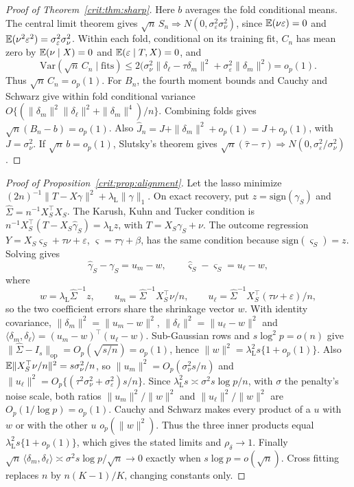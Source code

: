 \begin{proof}[Proof of Theorem~\ref{crit:thm:sharp}]
Here $b$ averages the fold conditional means. The central limit theorem gives $\sqrt n\,S_n\Rightarrow N(0,\sigma_\varepsilon^2\sigma_\nu^2)$, since $\mathbb{E}(\nu\varepsilon)=0$ and $\mathbb{E}(\nu^2\varepsilon^2)=\sigma_\varepsilon^2\sigma_\nu^2$. Within each fold, conditional on its training fit, $C_n$ has mean zero by $\mathbb{E}(\nu\mid X)=0$ and $\mathbb{E}(\varepsilon\mid T,X)=0$, and
\[
\mathrm{Var}(\sqrt n\,C_n\mid\text{fits})\le2\bigl(\sigma_\nu^2\|\delta_\ell-\tau\delta_m\|^2+\sigma_\varepsilon^2\|\delta_m\|^2\bigr)=o_p(1).
\]
Thus $\sqrt n\,C_n=o_p(1)$. For $B_n$, the fourth moment bounds and Cauchy and Schwarz give within fold conditional variance $O\{(\|\delta_m\|^2\|\delta_\ell\|^2+\|\delta_m\|^4)/n\}$. Combining folds gives $\sqrt n(B_n-b)=o_p(1)$. Also $\hat J_n=J+\|\delta_m\|^2+o_p(1)=J+o_p(1)$, with $J=\sigma_\nu^2$. If $\sqrt n\,b=o_p(1)$, Slutsky's theorem gives $\sqrt n(\hat\tau-\tau)\Rightarrow N(0,\sigma_\varepsilon^2/\sigma_\nu^2)$.
\end{proof}

\begin{proof}[Proof of Proposition~\ref{crit:prop:alignment}]
Let the lasso minimize $(2n)^{-1}\|T-X\gamma\|^2+\lambda_{\mathrm L}\|\gamma\|_1$. On exact recovery, put $z=\mathrm{sign}(\gamma_S)$ and $\hat\Sigma=n^{-1}X_S^\top X_S$. The Karush, Kuhn and Tucker condition is $n^{-1}X_S^\top(T-X_S\hat\gamma_S)=\lambda_{\mathrm L}z$, with $T=X_S\gamma_S+\nu$. The outcome regression $Y=X_S\varsigma_S+\tau\nu+\varepsilon$, $\varsigma=\tau\gamma+\beta$, has the same condition because $\mathrm{sign}(\varsigma_S)=z$. Solving gives
\[
\hat\gamma_S-\gamma_S=u_m-w,\qquad \hat\varsigma_S-\varsigma_S=u_\ell-w,
\]
where
\[
w=\lambda_{\mathrm L}\hat\Sigma^{-1}z,\qquad u_m=\hat\Sigma^{-1}X_S^\top\nu/n,\qquad u_\ell=\hat\Sigma^{-1}X_S^\top(\tau\nu+\varepsilon)/n,
\]
so the two coefficient errors share the shrinkage vector $w$. With identity covariance, $\|\delta_m\|^2=\|u_m-w\|^2$, $\|\delta_\ell\|^2=\|u_\ell-w\|^2$ and $\langle\delta_m,\delta_\ell\rangle=(u_m-w)^\top(u_\ell-w)$. Sub-Gaussian rows and $s\log^2p=o(n)$ give $\|\hat\Sigma-I_s\|_{\mathrm{op}}=O_p(\sqrt{s/n})=o_p(1)$, hence $\|w\|^2=\lambda_{\mathrm L}^2s\{1+o_p(1)\}$. Also $\mathbb{E}\|X_S^\top\nu/n\|^2=s\sigma_\nu^2/n$, so $\|u_m\|^2=O_p(\sigma_\nu^2s/n)$ and $\|u_\ell\|^2=O_p\{(\tau^2\sigma_\nu^2+\sigma_\varepsilon^2)s/n\}$. Since $\lambda_{\mathrm L}^2s\asymp\sigma^2s\log p/n$, with $\sigma$ the penalty's noise scale, both ratios $\|u_m\|^2/\|w\|^2$ and $\|u_\ell\|^2/\|w\|^2$ are $O_p(1/\log p)=o_p(1)$. Cauchy and Schwarz makes every product of a $u$ with $w$ or with the other $u$ $o_p(\|w\|^2)$. Thus the three inner products equal $\lambda_{\mathrm L}^2s\{1+o_p(1)\}$, which gives the stated limits and $\rho_\delta\to1$. Finally $\sqrt n\,\langle\delta_m,\delta_\ell\rangle\asymp\sigma^2s\log p/\sqrt n\to0$ exactly when $s\log p=o(\sqrt n)$. Cross fitting replaces $n$ by $n(K-1)/K$, changing constants only.
\end{proof}

